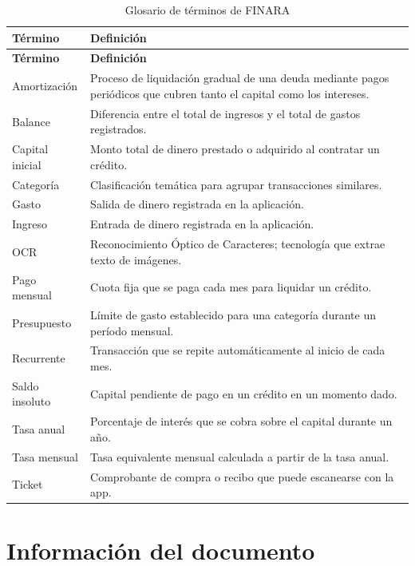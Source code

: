 \documentclass[a4paper,12pt]{report}
\begin{document}
\begin{longtable}{lp{10cm}}
  \caption{Glosario de términos de FINARA}
  \label{tab:glosario} \\
  \toprule
  \textbf{Término} & \textbf{Definición} \\
  \midrule
  \endfirsthead
  \toprule
  \textbf{Término} & \textbf{Definición} \\
  \midrule
  \endhead
  Amortización &
    Proceso de liquidación gradual de una deuda mediante pagos
    periódicos que cubren tanto el capital como los intereses. \\[4pt]
  Balance &
    Diferencia entre el total de ingresos y el total de gastos
    registrados. \\[4pt]
  Capital inicial &
    Monto total de dinero prestado o adquirido al contratar un
    crédito. \\[4pt]
  Categoría &
    Clasificación temática para agrupar transacciones similares. \\[4pt]
  Gasto &
    Salida de dinero registrada en la aplicación. \\[4pt]
  Ingreso &
    Entrada de dinero registrada en la aplicación. \\[4pt]
  OCR &
    Reconocimiento Óptico de Caracteres; tecnología que extrae texto
    de imágenes. \\[4pt]
  Pago mensual &
    Cuota fija que se paga cada mes para liquidar un crédito. \\[4pt]
  Presupuesto &
    Límite de gasto establecido para una categoría durante un período
    mensual. \\[4pt]
  Recurrente &
    Transacción que se repite automáticamente al inicio de cada
    mes. \\[4pt]
  Saldo insoluto &
    Capital pendiente de pago en un crédito en un momento dado. \\[4pt]
  Tasa anual &
    Porcentaje de interés que se cobra sobre el capital durante un
    año. \\[4pt]
  Tasa mensual &
    Tasa equivalente mensual calculada a partir de la tasa anual. \\[4pt]
  Ticket &
    Comprobante de compra o recibo que puede escanearse con la
    app. \\
  \bottomrule
\end{longtable}


\chapter*{Información del documento}
\end{document}
